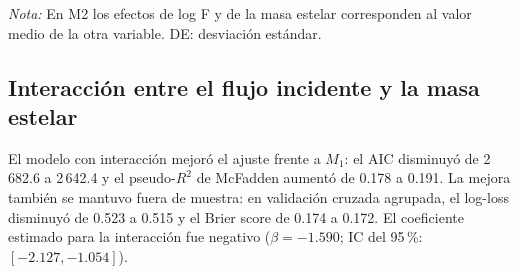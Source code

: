 \begin{table}[htbp]
    \centering
    \caption{Super-Tierras y sub-Neptunos: razones de momios de ser sub-Neptuno por incrementos físicos y por una desviación estándar de cada predictor.}
    \label{tab:Z-T7}
    \small
    \par\smallskip
    {\footnotesize\textit{Nota:} En M2 los efectos de log F y de la masa estelar corresponden al valor medio de la otra variable. DE: desviación estándar.}
\end{table}

\subsection{Interacción entre el flujo incidente y la masa estelar}
\label{sec:res-zoom-interaccion}

El modelo con interacción mejoró el ajuste frente a $M_1$: el AIC disminuyó de 2\,682.6 a 2\,642.4 y el pseudo-$R^2$ de McFadden aumentó de 0.178 a 0.191. La mejora también se mantuvo fuera de muestra: en validación cruzada agrupada, el log-loss disminuyó de 0.523 a 0.515 y el Brier score de 0.174 a 0.172. El coeficiente estimado para la interacción fue negativo ($\beta=-1.590$; IC del 95\,\%: $[-2.127,-1.054]$).

